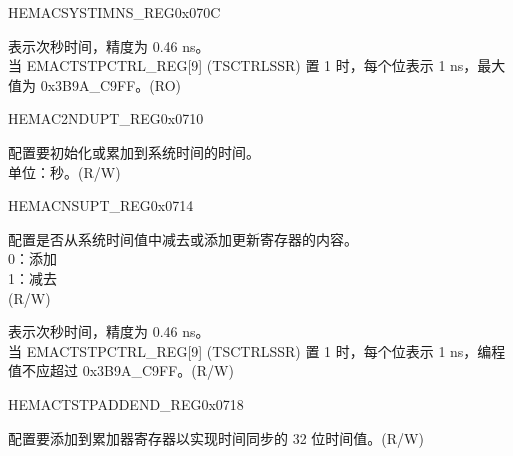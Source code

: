 \begin{register}{H}{EMACSYSTIMNS\_REG}{0x070C}\label{regdesc:EMACSYSTEMTIMENANOSSREG}
%
%
\regnewline%
\begin{regdesc}\begin{reglist}
\item [TSSS] 表示次秒时间，精度为 0.46 ns。\\
当 EMACTSTPCTRL\_REG[9] (TSCTRLSSR) 置 1 时，每个位表示 1 ns，最大值为 0x3B9A\_C9FF。(RO)
\end{reglist}\end{regdesc}
\end{register}

\begin{register}{H}{EMAC2NDUPT\_REG}{0x0710}\label{regdesc:EMACSECONDSUPDATEREG}
%
\regnewline%
\begin{regdesc}\begin{reglist}
\item [TSSSUPD] 配置要初始化或累加到系统时间的时间。\\
单位：秒。(R/W)
\end{reglist}\end{regdesc}
\end{register}

\begin{register}{H}{EMACNSUPT\_REG}{0x0714}\label{regdesc:EMACNANOSUPDATEREG}
%
%
\regnewline%
\begin{regdesc}\begin{reglist}
\item [ADDSUB] 配置是否从系统时间值中减去或添加更新寄存器的内容。\\
0：添加\\
1：减去\\(R/W)
\item [TSSSUPD] 表示次秒时间，精度为 0.46 ns。\\
当 EMACTSTPCTRL\_REG[9] (TSCTRLSSR) 置 1 时，每个位表示 1 ns，编程值不应超过 0x3B9A\_C9FF。(R/W)
\end{reglist}\end{regdesc}
\end{register}

\begin{register}{H}{EMACTSTPADDEND\_REG}{0x0718}\label{regdesc:EMACTIMESTAMPADDENDREG}
%
\regnewline%
\begin{regdesc}\begin{reglist}
\item [TSAR] 配置要添加到累加器寄存器以实现时间同步的 32 位时间值。(R/W)
\end{reglist}\end{regdesc}
\end{register}

